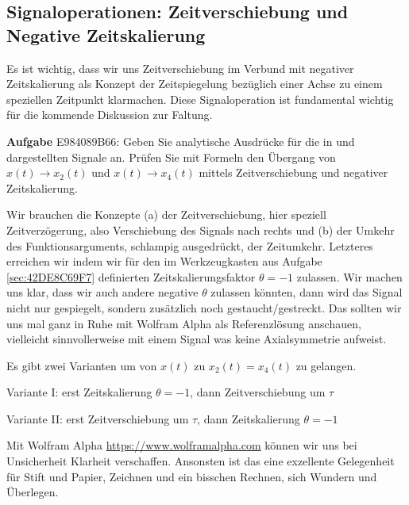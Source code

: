 \subsection{Signaloperationen: Zeitverschiebung und Negative Zeitskalierung}
\label{sec:E984089B66}
\begin{Ziel}
Es ist wichtig, dass wir uns Zeitverschiebung im Verbund mit negativer Zeitskalierung
als Konzept der Zeitspiegelung bezüglich einer Achse zu einem speziellen Zeitpunkt
klarmachen. Diese Signaloperation ist fundamental wichtig für die kommende Diskussion zur Faltung.
\end{Ziel}
\textbf{Aufgabe} {\tiny E984089B66}: Geben Sie analytische Ausdrücke für die in
 und  dargestellten Signale an.
Prüfen Sie mit Formeln den Übergang von $x(t) \rightarrow x_2(t)$ und
$x(t) \rightarrow x_4(t)$ mittels Zeitverschiebung und negativer Zeitskalierung.
\begin{Werkzeug}
Wir brauchen die Konzepte (a) der Zeitverschiebung, hier speziell Zeitverzögerung,
also Verschiebung des Signals nach rechts und (b) der Umkehr des Funktionsarguments,
schlampig ausgedrückt, der Zeitumkehr. Letzteres erreichen wir indem wir
für den im Werkzeugkasten aus Aufgabe \ref{sec:42DE8C69F7} definierten
Zeitskalierungsfaktor
$\theta=-1$ zulassen. Wir machen uns klar, dass wir auch andere negative
$\theta$ zulassen könnten, dann wird das Signal nicht nur gespiegelt,
sondern zusätzlich noch gestaucht/gestreckt. Das sollten wir uns mal ganz in Ruhe
mit Wolfram Alpha als Referenzlösung anschauen, vielleicht sinnvollerweise mit einem Signal was keine Axialsymmetrie aufweist.
\end{Werkzeug}
\vspace{-2em}
\begin{Ansatz}
Es gibt zwei Varianten um von $x(t)$ zu $x_2(t)=x_4(t)$ zu gelangen.

Variante I: erst Zeitskalierung $\theta=-1$, dann Zeitverschiebung um $\tau$

Variante II: erst Zeitverschiebung um $\tau$, dann Zeitskalierung $\theta=-1$

\end{Ansatz}
\vspace{-2em}
\begin{ExCalc}
Mit Wolfram Alpha \url{https://www.wolframalpha.com} können wir uns bei
Unsicherheit Klarheit verschaffen.
%
Ansonsten ist das eine exzellente Gelegenheit für Stift und Papier,
Zeichnen und ein bisschen Rechnen, sich Wundern und Überlegen.
\end{ExCalc}
